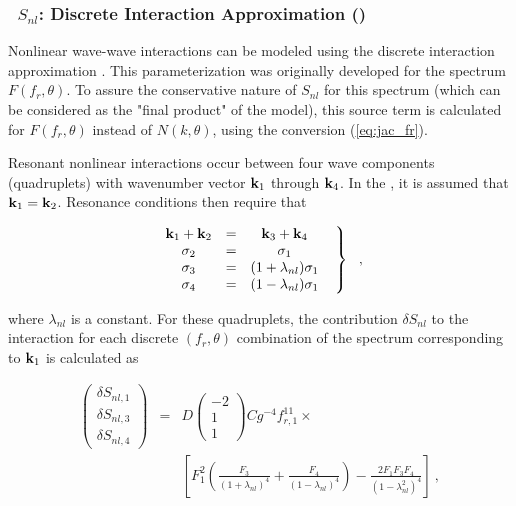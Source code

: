 \vsssub
\subsubsection{~$S_{nl}$: Discrete Interaction Approximation (\dia)} \label{sec:NL1}
\vsssub


\noindent
Nonlinear wave-wave interactions can be modeled using the discrete interaction
approximation \citep[\dia,][]{art:Hea85b}. This parameterization was
originally developed for the spectrum $F(f_r ,\theta)$. To assure the
conservative nature of $S_{nl}$ for this spectrum (which can be considered as
the "final product" of the model), this source term is calculated for
$F(f_r,\theta)$ instead of $N(k,\theta)$, using the conversion
(\ref{eq:jac_fr}).

Resonant nonlinear interactions occur between four wave components
(quadruplets) with wavenumber vector $\mbox{\bf k}_1$ through $\mbox{\bf k}_4$. In the \dia, it
is assumed that $\mbox{\bf k}_1 = \mbox{\bf k}_2$. Resonance conditions then require that


\begin{equation} \left .
\begin{array}{ccc}
  \mbox{\bf k}_1 + \mbox{\bf k}_2 & = & \mbox{\bf k}_3 + \mbox{\bf k}_4          \\
  \sigma_2  & = & \sigma_1                   \\
  \sigma_3  & = & (1+\lambda_{nl})\sigma_1   \\
  \sigma_4  & = & (1-\lambda_{nl})\sigma_1
\end{array} \:\:\: \right \rbrace \:\:\: , \label{eq:resonance}
\end{equation}

\noindent
where $\lambda_{nl}$ is a constant. For these quadruplets, the contribution
$\delta S_{nl}$ to the interaction for each discrete $(f_r,\theta)$
combination of the spectrum corresponding to $\mbox{\bf k}_1$ is calculated as


\begin{eqnarray}
\left ( \begin{array}{c}
  \delta S_{nl,1} \\ \delta S_{nl,3} \\ \delta S_{nl,4}
\end{array} \right ) & = & D
\left ( \begin{array}{r} -2 \\ 1 \\ 1 \end{array} \right )
C g^{-4} f_{r,1}^{11} \times \nonumber \\
& & \left [ F_1^2
\left ( \frac{F_3}{(1+\lambda_{nl})^4} +
        \frac{F_4}{(1-\lambda_{nl})^4} \right ) -
\frac{2 F_1 F_3 F_4}{(1-\lambda_{nl}^2)^4}
\right ] \: , \label{eq:snl_dia}
\end{eqnarray}

